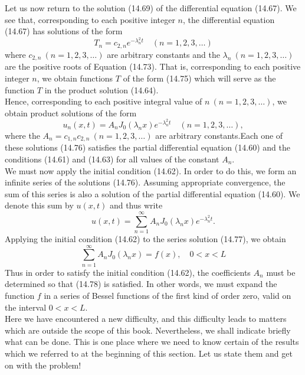 \documentclass[11pt,a4paper, twoside]{report}
\begin{document}
	Let us now return to the solution (14.69) of the differential equation (14.67). We see that, corresponding to each positive integer $n$, the differential equation (14.67) has solutions of the form
	\begin{equation}\tag{14.75}
		T_n = c_{2,n}e^{-\lambda_n^2t}\quad (n=1,2,3,\ldots)
	\end{equation}
	where $c_{2,n}\ (n=1,2,3,\ldots)$ are arbitrary constants and the $\lambda_n\ (n = 1, 2, 3, \ldots)$ are the positive roots of Equation (14.73). That is, corresponding to each positive integer $n$, we obtain functions $T$ of the form (14.75) which will serve as the function $T$ in the product solution (14.64).\\
	Hence, corresponding to each positive integral value of $n\ (n = 1, 2, 3, \ldots)$, we obtain product solutions of the form
	\begin{equation}\tag{14.76}
		u_n(x, t) = A_nJ_0(\lambda_n x)e^{-\lambda_n^2t}\quad (n=1,2,3,\ldots),
	\end{equation}
	where the $A_n = c_{1,n}c_{2,n}\ (n=1,2,3,\ldots)$ are arbitrary constants.Each one of these solutions (14.76) satisfies the partial differential equation (14.60) and the conditions (14.61) and (14.63) for all values of the constant $A_n$.\\
	We must now apply the initial condition (14.62). In order to do this, we form an infinite series of the solutions (14.76). Assuming appropriate convergence, the sum of this series is also a solution of the partial differential equation (14.60). We denote this sum by $u(x, t)$ and thus write
	\begin{equation}\tag{14.77}
		u(x,t) = \sum_{n=1}^\infty A_nJ_0(\lambda_nx)e^{-\lambda_n^2t}.
	\end{equation}
	Applying the initial condition (14.62) to the series solution (14.77), we obtain
	\begin{equation}\tag{14.78}
		\sum_{n=1}^\infty A_nJ_0(\lambda_n x) = f(x),\quad 0 < x < L
	\end{equation}
	Thus in order to satisfy the initial condition (14.62), the coefficients $A_n$ must be  determined so that (14.78) is satisfied. In other words, we must expand the function $f$ in a series of Bessel functions of the first kind of order zero, valid on the interval $0 < x < L$.\\
	Here we have encountered a new difficulty, and this difficulty leads to matters which are outside the scope of this book. Nevertheless, we shall indicate briefly what can be done. This is one place where we need to know certain of the results which we referred to at the beginning of this section. Let us state them and get on with the problem!\\
\end{document}
